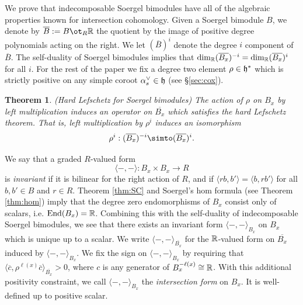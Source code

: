 \documentclass[11pt]{amsart}
\numberwithin{equation}{section}
\def\BS{{\EuScript B}}
\def\ov{\overline}
\def\to{\rightarrow}
\DeclareMathOperator{\End}{End} %
\newtheorem{thm}{Theorem}[section]
\theoremstyle{definition}
\theoremstyle{remark}
\begin{document}
We prove that indecomposable Soergel bimodules have all of the algebraic properties
known for intersection cohomology.  Given a Soergel bimodule $B$, we
denote by $\ov{B} := B \ot_R \RM$ the quotient by the
image of positive degree polynomials acting on the right.
We let
$(\overline{B})^i$ denote the degree $i$ component of
$\overline{B}$. The self-duality of Soergel bimodules implies that
$\dim_{{\mathbb{R}}}(\overline{B_x})^{-i} = \dim_{{\mathbb{R}}}(\overline{B_x})^i$ for all $i$.
For the rest of the paper we fix a degree two element $\rho \in {\mathfrak h}^*$
which is strictly positive on any simple coroot $\alpha_s^\vee \in
{\mathfrak h}$ (see \S\ref{sec:cox}).

\begin{thm} (Hard Lefschetz for Soergel bimodules) \label{thm:HL} The action of $\rho$ on $B_x$ by left multiplication induces an operator on $\ov{B_x}$ which satisfies the hard
Lefschetz theorem. That is, left multiplication by $\rho^i$ induces an
isomorphism \[ \rho^i  : (\ov{B_x})^{-i} \simto (\ov{B_x})^i. \] \end{thm}

We say that a graded $R$-valued form \[ \langle -, - \rangle : B_x \times B_x \to R \] is \emph{invariant} if it is bilinear for the right action of $R$, and if $\langle rb,
b' \rangle = \langle b, rb' \rangle$ for all $b,b' \in B$ and $r \in
R$. Theorem \ref{thm:SC} and Soergel's hom formula (see Theorem
\ref{thm:hom}) imply that the
degree zero endomorphisms of $B_x$ consist only of scalars, i.e. $\End(B_x) = \RM$. Combining this with the self-duality of
indecomposable Soergel bimodules, we see that there exists an
invariant form  $\langle -, - \rangle_{B_x}$ on $B_x$ which is unique up to a
scalar. We write $\langle -, - \rangle_{\ov{B_x}}$ for the ${\mathbb{R}}$-valued form on $\ov{B_x}$ induced by $\langle -, - \rangle_{B_x}$. We
fix the sign on $\langle -, - \rangle_{B_x}$ by requiring that $\langle \ov{c}, \rho^{\ell(x)} \ov{c} \rangle_{\ov{B_x}} > 0$, where $c$ is any generator of $B_x^{-\ell(x)} \cong {\mathbb{R}}$.
With this additional positivity constraint, we call $\langle -, -
\rangle_{B_x}$ the \emph{intersection form} on $B_x$. It is well-defined up to positive scalar.
\end{document}
